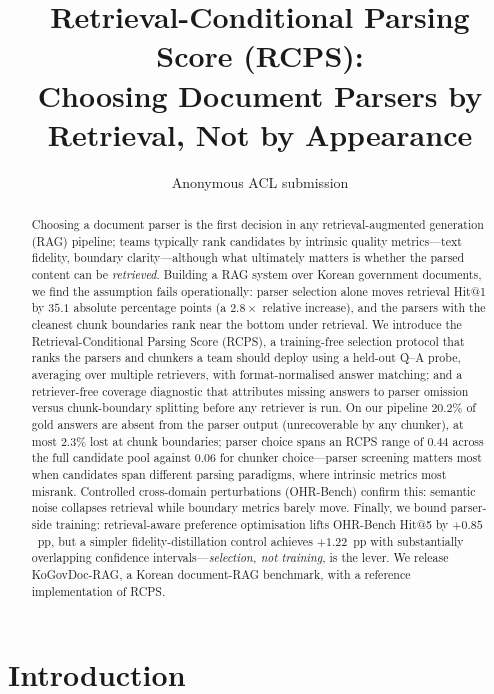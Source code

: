 \documentclass[11pt]{article}
\title{Retrieval-Conditional Parsing Score (RCPS):\\Choosing Document Parsers by Retrieval, Not by Appearance}
\author{Anonymous ACL submission}
\newcommand{\rcps}{\textsc{RCPS}}
\begin{document}
\maketitle

\begin{abstract}
Choosing a document parser is the first decision in any retrieval-augmented generation (RAG) pipeline; teams typically rank candidates by intrinsic quality metrics---text fidelity, boundary clarity---although what ultimately matters is whether the parsed content can be \emph{retrieved}. Building a RAG system over Korean government documents, we find the assumption fails operationally: parser selection alone moves retrieval Hit@1 by $35.1$ absolute percentage points (a $2.8\times$ relative increase), and the parsers with the cleanest chunk boundaries rank near the bottom under retrieval. We introduce the Retrieval-Conditional Parsing Score (\rcps{}), a training-free selection protocol that ranks the parsers and chunkers a team should deploy using a held-out Q--A probe, averaging over multiple retrievers, with format-normalised answer matching; and a retriever-free coverage diagnostic that attributes missing answers to parser omission versus chunk-boundary splitting before any retriever is run. On our pipeline $20.2\%$ of gold answers are absent from the parser output (unrecoverable by any chunker), at most $2.3\%$ lost at chunk boundaries; parser choice spans an \rcps{} range of $0.44$ across the full candidate pool against $0.06$ for chunker choice---parser screening matters most when candidates span different parsing paradigms, where intrinsic metrics most misrank. Controlled cross-domain perturbations (OHR-Bench) confirm this: semantic noise collapses retrieval while boundary metrics barely move. Finally, we bound parser-side training: retrieval-aware preference optimisation lifts OHR-Bench Hit@5 by $+0.85$~pp, but a simpler fidelity-distillation control achieves $+1.22$~pp with substantially overlapping confidence intervals---\emph{selection, not training}, is the lever. We release KoGovDoc-RAG, a Korean document-RAG benchmark, with a reference implementation of \rcps{}.
\end{abstract}

\section{Introduction}
\end{document}
